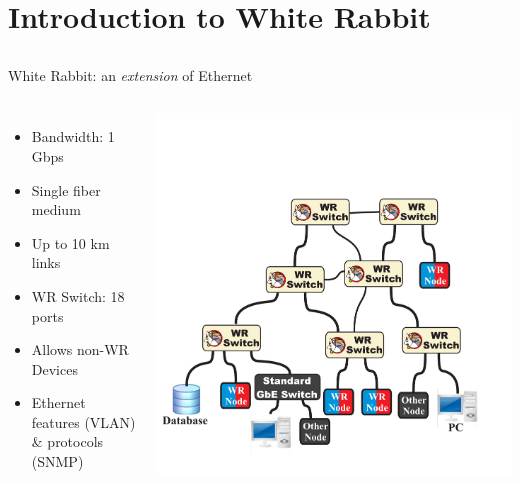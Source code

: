 \documentclass[compress, red]{beamer}
\begin{document}
\section[WR Intro]{Introduction to White Rabbit}
\subsection{}

\begin{frame}{White Rabbit: an \emph{extension} of Ethernet}

\begin{columns}[c]
 

  \begin{itemize}
    \item Bandwidth: 1 Gbps
    \item Single fiber medium
    \item Up to 10 km links
    \item WR Switch: 18 ports
    \item Allows non-WR Devices
    \item Ethernet features (VLAN) \& protocols (SNMP)
  \end{itemize}

    \begin{center}
    \includegraphics[width=1.0\textwidth]{network/WR_network-ethernet.pdf}
    \end{center}
\end{columns}

\end{frame}
\end{document}

